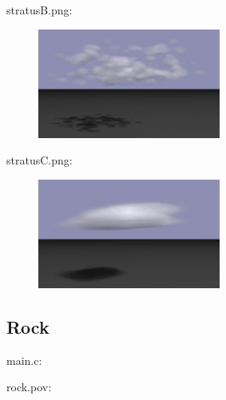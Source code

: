 stratusB.png:\\
\begin{center}
\begin{figure}[H]
\centering\includegraphics[width=6cm]{./stratusB.png}\\
\end{figure}
\end{center}

stratusC.png:\\
\begin{center}
\begin{figure}[H]
\centering\includegraphics[width=6cm]{./stratusC.png}\\
\end{figure}
\end{center}

\subsection{Rock}

main.c:\\
\begin{scriptsize}
\begin{ttfamily}

\end{ttfamily}
\end{scriptsize}

rock.pov:\\
\begin{scriptsize}
\begin{ttfamily}

\end{ttfamily}
\end{scriptsize}

